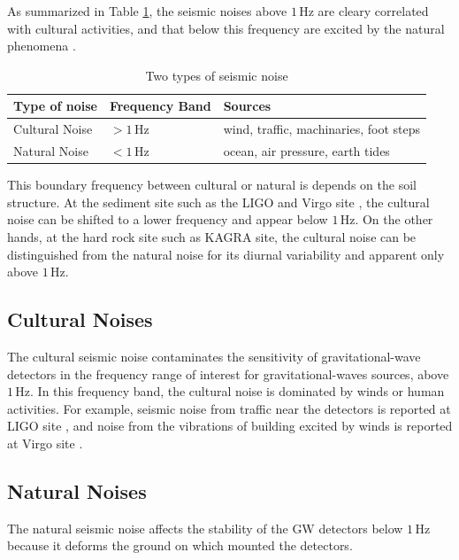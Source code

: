 As summarized in Table \ref{tb:31}, the seismic noises above $1\,\mathrm{Hz}$ are cleary correlated with cultural activities, and that below this frequency are excited by the natural phenomena \cite{bonnefoy2006nature}.
\begin{table}[h] 
  \begin{center}
    \caption{Two types of seismic noise}\label{tb:31}
    \begin{tabular}{lll} 
      \hline      
      Type of noise & Frequency Band & Sources \\ \hline \hline
      Cultural Noise & $> 1\,\mathrm{Hz}$ & wind, traffic, machinaries, foot steps\\
      Natural Noise  & $< 1\,\mathrm{Hz}$ & ocean, air pressure, earth tides\\
    \end{tabular}
  \end{center}
\end{table}

This boundary frequency between cultural or natural is depends on the soil structure. At the sediment site such as the LIGO \cite{Daw_2004} and Virgo site \cite{Beker_2012}, the cultural noise can be shifted to a lower frequency and appear below $1\,\mathrm{Hz}$. On the other hands, at the hard rock site such as KAGRA site, the cultural noise can be distinguished from the natural noise for its diurnal variability and apparent only above $1\,\mathrm{Hz}$.


\subsection{Cultural Noises} \label{sec:321}
The cultural seismic noise contaminates the sensitivity of gravitational-wave detectors in the frequency range of interest for gravitational-waves sources, above $1\,\mathrm{Hz}$. In this frequency band, the cultural noise is dominated by winds or human activities. For example, seismic noise from traffic near the detectors is reported at LIGO site \cite{schofield2000source}, and noise from the vibrations of building excited by winds is reported at Virgo site \cite{acernese2004properties}. 

\subsection{Natural Noises} \label{sec:322}
The natural seismic noise affects the stability of the GW detectors below $1\,\mathrm{Hz}$ because it deforms the ground on which mounted the detectors.

